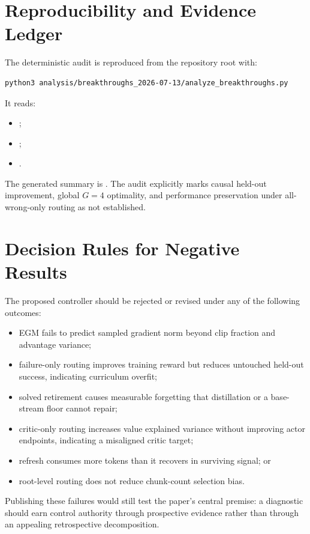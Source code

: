 \documentclass{article}
\begin{document}
\section{Reproducibility and Evidence Ledger}
\label{app:ledger}

The deterministic audit is reproduced from the repository root with:
\begin{verbatim}
python3 analysis/breakthroughs_2026-07-13/analyze_breakthroughs.py
\end{verbatim}
It reads:
\begin{itemize}[leftmargin=*]
  \item {};
  \item {};
  \item {}.
\end{itemize}
The generated summary is
.  The audit explicitly
marks causal held-out improvement, global $G=4$ optimality, and performance
preservation under all-wrong-only routing as not established.

\section{Decision Rules for Negative Results}

The proposed controller should be rejected or revised under any of the
following outcomes:
\begin{itemize}[leftmargin=*]
  \item EGM fails to predict sampled gradient norm beyond clip fraction and
  advantage variance;
  \item failure-only routing improves training reward but reduces untouched
  held-out success, indicating curriculum overfit;
  \item solved retirement causes measurable forgetting that distillation or a
  base-stream floor cannot repair;
  \item critic-only routing increases value explained variance without
  improving actor endpoints, indicating a misaligned critic target;
  \item refresh consumes more tokens than it recovers in surviving signal; or
  \item root-level routing does not reduce chunk-count selection bias.
\end{itemize}
Publishing these failures would still test the paper's central premise: a
diagnostic should earn control authority through prospective evidence rather
than through an appealing retrospective decomposition.
\end{document}
